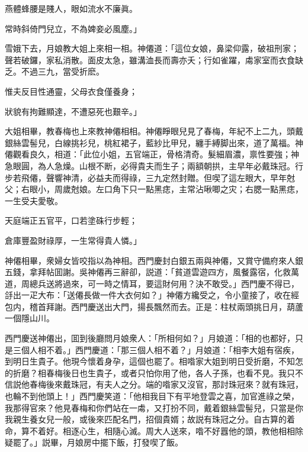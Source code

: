 \begin{myquote}
燕體蜂腰是賤人，眼如流水不廉眞。

常時斜倚門兒立，不為婢妾必風塵。」
\end{myquote}

雪娥下去，月娘教大姐上來相一相。神僊道：「這位女娘，鼻梁仰露，破祖刑家；聲若破鑼，家私消散。面皮太急，雖溝洫長而壽亦夭；行如雀躍，䖏家室而衣食缺乏。不過三九，當受折麽。

\begin{myquote}
惟夫反目性通靈，父母衣食僅養身；

狀貌有拘難顯達，不遭惡死也艱辛。」
\end{myquote}

大姐相畢，教春梅也上來教神僊相相。神僊睜眼兒見了春梅，年紀不上二九，頭戴銀絲雲髻兒，白線挑衫兒，桃紅裙子，藍紗比甲兒，纏手縛脚出來，道了萬福。神僊觀看良久，相道：「此位小姐，五官端正，骨格清奇。髮細眉濃，禀性要強；神急眼圓，為人急燥。山根不断，必得貴夫而生子；兩額朝拱，主早年必戴珠冠。行步若飛僊，聲響神清，必益夫而得祿，三九定然封贈。但喫了這左眼大，早年尅父；右眼小，周歲尅娘。左口角下只一點黑痣，主常沾啾唧之灾；右腮一點黑痣，一生受夫愛敬。

\begin{myquote}
天庭端正五官平，口若塗硃行步輕；

倉庫豐盈財祿厚，一生常得貴人憐。」
\end{myquote}

神僊相畢，衆婦女皆咬指以為神相。西門慶封白銀五兩與神僊，又賞守備府來人銀五錢，拿拜帖囬謝。吳神僊再三辭卻，説道：「貧道雲遊四方，風餐露宿，化救萬道，周總兵送將過來，可一時之情耳，要這財何用？決不敢受。」西門慶不得已，㧱出一疋大布：「送僊長做一件大衣何如？」神僊方纔受之，令小童接了，收在經包内，稽首拜謝。西門慶送出大門，揚長飄然而去。正是：柱杖兩頭挑日月，葫蘆一個隱山川。

西門慶送神僊出，囬到後廳問月娘衆人：「所相何如？」月娘道：「相的也都好，只是三個人相不着。」西門慶道：「那三個人相不着？」月娘道：「相李大姐有宿疾，到明日生貴子。他現今懷着身孕，這個也罷了。相喒家大姐到明日受折磨，不知怎的折磨？相春梅後日也生貴子，或者只怕你用了他，各人子孫，也看不見。我只不信説他春梅後來戴珠冠，有夫人之分。端的喒家又沒官，那討珠冠來？就有珠冠，也輪不到他頭上！」西門慶笑道：「他相我目下有平地登雲之喜，加官進祿之榮，我那得官來？他見春梅和你們站在一䖏，又打扮不同，戴着銀絲雲髻兒，只當是你我親生養女兒一般，或後來匹配名門，招個貴婿；故説有珠冠之分。自古算的着命，算不着好。相逐心生，相隨心滅。周大人送來，喒不好囂他的頭，教他相相除疑罷了。」説畢，月娘房中擺下飯，打發喫了飯。

